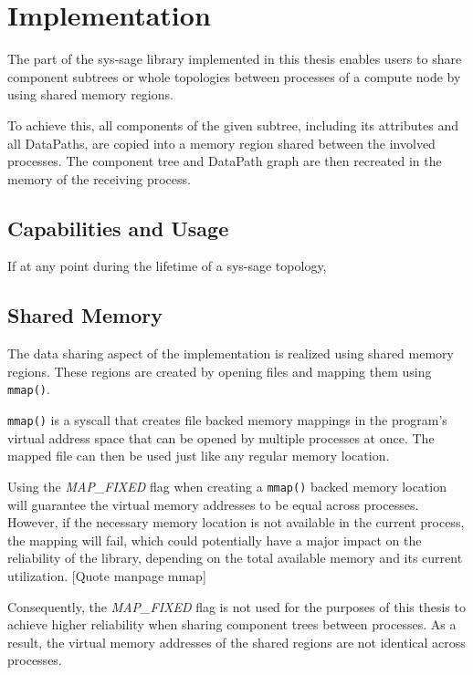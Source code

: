 
\chapter{Implementation}\label{chapter:Implementation}

The part of the sys-sage library implemented in this thesis enables users to share component subtrees or whole topologies between processes of a compute node by using shared memory regions.

To achieve this, all components of the given subtree, including its attributes and all DataPaths, are copied into a memory region shared between the involved processes.
The component tree and DataPath graph are then recreated in the memory of the receiving process.

\section{Capabilities and Usage}
If at any point during the lifetime of a sys-sage topology,

\section{Shared Memory}
The data sharing aspect of the implementation is realized using shared memory regions. These regions are created by opening files and mapping them using \lstinline{mmap()}.

\lstinline{mmap()} is a syscall that creates file backed memory mappings in the program's virtual address space that can be opened by multiple processes at once.
The mapped file can then be used just like any regular memory location. \cite{crotty22-mmap}

Using the \emph{MAP\_FIXED} flag when creating a \lstinline{mmap()} backed memory location will guarantee the virtual memory addresses to be equal across processes.
However, if the necessary memory location is not available in the current process, the mapping will fail, which could potentially have a major impact on the reliability of the library,
depending on the total available memory and its current utilization. [Quote manpage mmap] %

Consequently, the \emph{MAP\_FIXED} flag is not used for the purposes of this thesis to achieve higher reliability when sharing component trees between processes.
As a result, the virtual memory addresses of the shared regions are not identical across processes.

